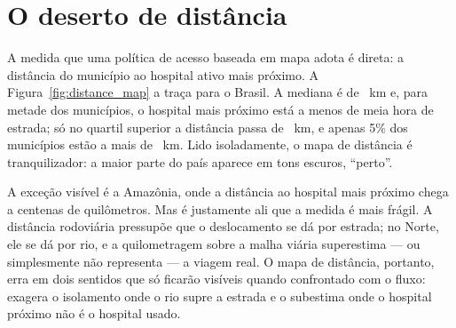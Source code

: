 
\section{O deserto de distância}
\label{sec:distancia}

A medida que uma política de acesso baseada em mapa adota é direta: a distância
do município ao hospital ativo mais próximo. A Figura~\ref{fig:distance_map} a
traça para o Brasil. A mediana é de \valMedIso~km e, para metade dos municípios,
o hospital mais próximo está a menos de meia hora de estrada; só no quartil
superior a distância passa de \valIsoPsevenfive~km, e apenas 5\% dos municípios
estão a mais de \valIsoPninetyfive~km.%
Lido isoladamente, o mapa de distância é tranquilizador: a maior parte do país
aparece em tons escuros, ``perto''.

A exceção visível é a Amazônia, onde a distância ao hospital mais próximo chega a
centenas de quilômetros. Mas é justamente ali que a medida é mais frágil. A
distância rodoviária pressupõe que o deslocamento se dá por estrada; no Norte,
ele se dá por rio, e a quilometragem sobre a malha viária superestima --- ou
simplesmente não representa --- a viagem real. O mapa de distância, portanto,
erra em dois sentidos que só ficarão visíveis quando confrontado com o fluxo:
exagera o isolamento onde o rio supre a estrada e o subestima onde o hospital
próximo não é o hospital usado.
